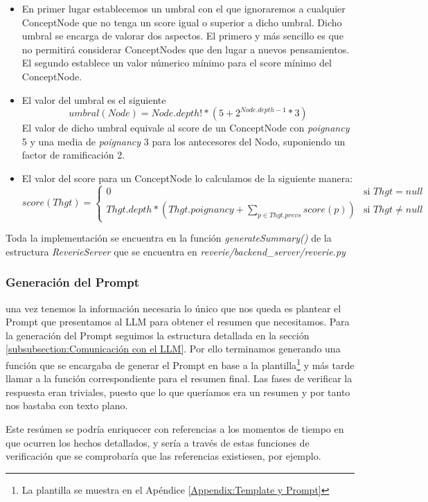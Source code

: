 \begin{itemize}
	\item En primer lugar establecemos un umbral con el que ignoraremos a cualquier ConceptNode que no tenga un score igual o superior a dicho umbral.
Dicho umbral se encarga de valorar dos aspectos. El primero y más sencillo es que no permitirá considerar ConceptNodes que den lugar a nuevos pensamientos. El segundo establece un valor númerico mínimo para el score mínimo del ConceptNode.
	\item El valor del umbral es el siguiente
\[
	umbral(Node) = Node.depth! * (5 + 2^{Node.depth - 1} * 3)
\]
El valor de dicho umbral equivale al score de un ConceptNode con \textit{poignancy} 5 y una media de \textit{poignancy} 3 para los antecesores del Nodo, suponiendo un factor de ramificación 2.
	\item El valor del score para un ConceptNode lo calculamos de la siguiente manera:
\[
score(Thgt) =
\begin{cases} 
     0 & \text{si } Thgt = null \\
     Thgt.depth * (Thgt.poignancy + \sum_{p \in Thgt.prevs} score(p)) & \text{si } Thgt \neq null
\end{cases}
\]
\end{itemize}

Toda la implementación se encuentra en la función \textit{generateSummary()} de la estructura \textit{ReverieServer} que se encuentra en \textit{reverie/backend\_server/reverie.py}

\subsubsection{Generación del Prompt}

una vez tenemos la información necesaria lo único que nos queda es plantear el Prompt que presentamos al LLM para obtener el resumen que necesitamos. Para la generación del Prompt seguimos la estructura detallada en la sección \ref{subsubsection:Comunicación con el LLM}. Por ello terminamos generando una función que se encargaba de generar el Prompt en base a la plantilla\footnote{La plantilla se muestra en el Apéndice \ref{Appendix:Template y Prompt}} y más tarde llamar a la función correspondiente para el resumen final. Las fases de verificar la respuesta eran triviales, puesto que lo que queríamos era un resumen y por tanto nos bastaba con texto plano.

Este resúmen se podría enriquecer con referencias a los momentos de tiempo en que ocurren los hechos detallados, y sería a través de estas funciones de verificación que se comprobaría que las referencias existiesen, por ejemplo.

